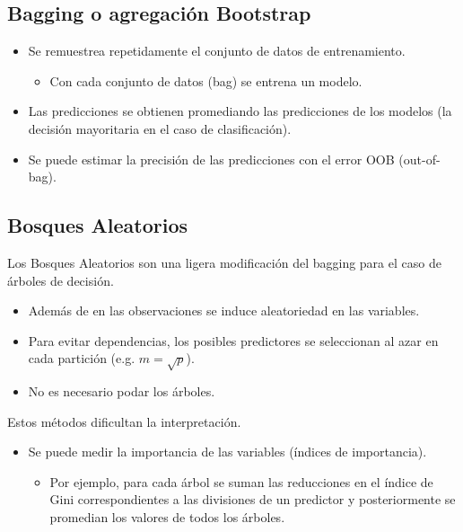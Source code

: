 \documentclass[]{book}
\providecommand{\tightlist}{%
  \setlength{\itemsep}{0pt}\setlength{\parskip}{0pt}}
\begin{document}
\subsection{Bagging o agregación
Bootstrap}\label{bagging-o-agregaciuxf3n-bootstrap}

\begin{itemize}
\item
  Se remuestrea repetidamente el conjunto de datos de entrenamiento.

  \begin{itemize}
  \tightlist
  \item
    Con cada conjunto de datos (bag) se entrena un modelo.
  \end{itemize}
\item
  Las predicciones se obtienen promediando las predicciones de los
  modelos (la decisión mayoritaria en el caso de clasificación).
\item
  Se puede estimar la precisión de las predicciones con el error OOB
  (out-of-bag).
\end{itemize}

\subsection{Bosques Aleatorios}\label{bosques-aleatorios}

Los Bosques Aleatorios son una ligera modificación del bagging para el
caso de árboles de decisión.

\begin{itemize}
\item
  Además de en las observaciones se induce aleatoriedad en las
  variables.
\item
  Para evitar dependencias, los posibles predictores se seleccionan al
  azar en cada partición (e.g. \(m=\sqrt{p}\)).
\item
  No es necesario podar los árboles.
\end{itemize}

Estos métodos dificultan la interpretación.

\begin{itemize}
\item
  Se puede medir la importancia de las variables (índices de
  importancia).

  \begin{itemize}
  \tightlist
  \item
    Por ejemplo, para cada árbol se suman las reducciones en el índice
    de Gini correspondientes a las divisiones de un predictor y
    posteriormente se promedian los valores de todos los árboles.
  \end{itemize}
\end{itemize}
\end{document}
